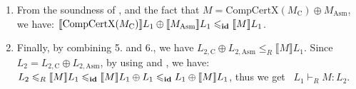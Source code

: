 \begin{enumerate}
\item From the soundness of 
, 
and the fact that  $M = \textrm{CompCertX}(M_\text{C}) \oplus M_\text{Asm}$,
we have:
$\llbracket \textrm{CompCertX}(M_\text{C}) \rrbracket L_1 \oplus
\llbracket M_\text{Asm} \rrbracket L_1 \leqslant_{\textbf{id}} \llbracket
M \rrbracket
L_1$.
\item
Finally, by combining 5. and 6., we have 
$L_{2, \text{C}} \oplus L_{2, \text{Asm}}
\leqslant_R  \llbracket M \rrbracket L_1$.  
Since~ $L_2 = L_{2, \text{C}} \oplus L_{2, \text{Asm}}$, 
by using 
and ,
we have: 
$L_2 \leqslant_R  \llbracket M \rrbracket L_1
\leqslant_{\textbf{id}} \llbracket M \rrbracket L_1 \oplus L_1
\leqslant_{\textbf{id}} L_1 \oplus \llbracket M \rrbracket L_1$,
thus we get ~$L_1 \vdash_R M : L_2$.
\end{enumerate} 


